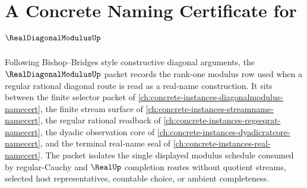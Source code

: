 \chapter{A Concrete Naming Certificate for $\RealDiagonalModulusUp$}
\label{ch:concrete-instances-real-diagonal-modulus-namecert}

Following Bishop--Bridges style constructive diagonal arguments, the $\RealDiagonalModulusUp$ packet records the rank-one modulus row used when a regular rational diagonal route is read as a real-name construction. It sits between the finite selector packet of \autoref{ch:concrete-instances-diagonalmodulus-namecert}, the finite stream surface of \autoref{ch:concrete-instances-streamname-namecert}, the regular rational readback of \autoref{ch:concrete-instances-regseqrat-namecert}, the dyadic observation core of \autoref{ch:concrete-instances-dyadicratcore-namecert}, and the terminal real-name seal of \autoref{ch:concrete-instances-real-namecert}. The packet isolates the single displayed modulus schedule consumed by regular-Cauchy and $\RealUp$ completion routes without quotient streams, selected host representatives, countable choice, or ambient completeness.

